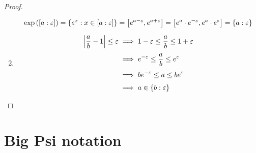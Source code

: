 \begin{proof}
\begin{enumerate}
      \begin{align}
        \exp\left(\an[\epsilon]{a}\right) = \left\{ e^x : x \in \an[\epsilon]{a}\right\} = \interval{e^{a-\epsilon}}{e^{a+\epsilon}} = \interval{e^a\cdot e^{-\epsilon}}{e^a\cdot e^\epsilon} = \ean[\epsilon]{a}
      \end{align}

    \item

      \begin{align}
        \abs{\frac ab - 1} \le \epsilon & \implies 1-\epsilon \le \frac ab \le 1+\epsilon \nl
        & \implies e^{-\epsilon} \le \frac ab \le e^{\epsilon} \nl
        & \implies be^{-\epsilon} \le a \le be^\epsilon \nl
        & \implies a \in \ean[\epsilon]{b}
      \end{align}
  \end{enumerate}

\end{proof}

\section{Big Psi notation}



